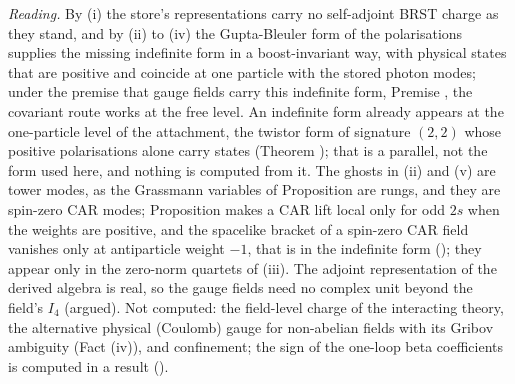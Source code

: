 \emph{Reading.} By (i) the store's representations carry no self-adjoint BRST charge as they stand, and by (ii) to (iv) the Gupta-Bleuler form of the polarisations supplies the missing indefinite form in a boost-invariant way, with physical states that are positive and coincide at one particle with the stored photon modes; under the premise that gauge fields carry this indefinite form, Premise , the covariant route works at the free level. An indefinite form already appears at the one-particle level of the attachment, the twistor form of signature $(2,2)$ whose positive polarisations alone carry states (Theorem ); that is a parallel, not the form used here, and nothing is computed from it. The ghosts in (ii) and (v) are tower modes, as the Grassmann variables of Proposition  are rungs, and they are spin-zero CAR modes; Proposition  makes a CAR lift local only for odd $2s$ when the weights are positive, and the spacelike bracket of a spin-zero CAR field vanishes only at antiparticle weight $-1$, that is in the indefinite form (); they appear only in the zero-norm quartets of (iii). The adjoint representation of the derived algebra is real, so the gauge fields need no complex unit beyond the field's $I_4$ (argued). Not computed: the field-level charge of the interacting theory, the alternative physical (Coulomb) gauge for non-abelian fields with its Gribov ambiguity (Fact (iv)), and confinement; the sign of the one-loop beta coefficients is computed in a result ().
